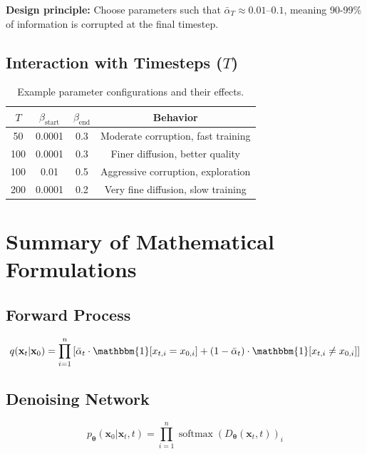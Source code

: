 \documentclass[11pt,a4paper]{article}
\newcommand{\vx}{\mathbf{x}}
\newcommand{\vtheta}{\boldsymbol{\theta}}
\DeclareMathOperator{\softmax}{softmax}
\begin{document}
\textbf{Design principle:} Choose parameters such that $\bar{\alpha}_T \approx 0.01$--$0.1$, meaning 90-99\% of information is corrupted at the final timestep.

\subsection{Interaction with Timesteps ($T$)}

\begin{table}[h]
\centering
\begin{tabular}{@{}cccc@{}}
\toprule
$T$ & $\beta_{\text{start}}$ & $\beta_{\text{end}}$ & Behavior \\
\midrule
50 & 0.0001 & 0.3 & Moderate corruption, fast training \\
100 & 0.0001 & 0.3 & Finer diffusion, better quality \\
100 & 0.01 & 0.5 & Aggressive corruption, exploration \\
200 & 0.0001 & 0.2 & Very fine diffusion, slow training \\
\bottomrule
\end{tabular}
\caption{Example parameter configurations and their effects.}
\label{tab:params}
\end{table}

\section{Summary of Mathematical Formulations}

\subsection{Forward Process}
\begin{equation}
    q(\vx_t | \vx_0) = \prod_{i=1}^{n} \left[\bar{\alpha}_t \cdot \mathbbm{1}[x_{t,i} = x_{0,i}] + (1-\bar{\alpha}_t) \cdot \mathbbm{1}[x_{t,i} \neq x_{0,i}]\right]
\end{equation}

\subsection{Denoising Network}
\begin{equation}
    p_\vtheta(\vx_0 | \vx_t, t) = \prod_{i=1}^{n} \softmax(D_\vtheta(\vx_t, t))_i
\end{equation}
\end{document}
